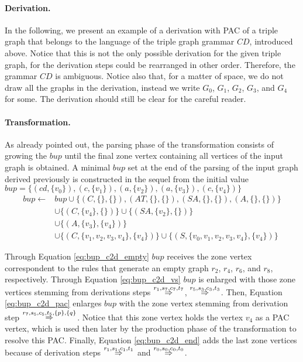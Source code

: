 \paragraph*{Derivation. } In the following, we present an example of a derivation with PAC of a triple graph that belongs to the language of the triple graph grammar $CD$, introduced above. Notice that this is not the only possible derivation for the given triple graph, for the derivation steps could be rearranged in other order. Therefore, the grammar $CD$ is ambiguous. Notice also that, for a matter of space, we do not draw all the graphs in the derivation, instead we write $G_0$, $G_1$, $G_2$, $G_3$, and $G_4$ for some. The derivation should still be clear for the careful reader.



\paragraph*{Transformation. } As already pointed out, the parsing phase of the transformation consists of growing the $bup$ until the final zone vertex containing all vertices of the input graph is obtained. A minimal $bup$ set at the end of the parsing of the input graph derived previously is constructed in the sequel from the initial value $bup = \{ (cd,\{v_0\}), (c,\{v_1\}), (a,\{v_2\}), (a,\{v_3\}), (c,\{v_4\}) \}$
\begin{align}
	\label{eq:bup_c2d_empty}
	bup \gets & bup \cup \{ (C, \{\}, \{\}),(AT, \{\}, \{\}),(SA, \{\}, \{\}),(A, \{\}, \{\}) \} \\
	\label{eq:bup_c2d_vs}
	& \cup \{ (C,\{v_4\}, \{\}) \} \cup \{ (SA,\{v_2\}, \{\}) \} \\
	\label{eq:bup_c2d_pac}
	& \cup \{ (A,\{v_3\}, \{v_4\}) \} \\
	\label{eq:bup_c2d_end}
	& \cup \{ (C,\{v_1,v_2,v_3,v_4\}, \{v_4\}) \} \cup \{ (S,\{v_0,v_1,v_2,v_3,v_4\}, \{v_4\}) \}
\end{align}

Through Equation \ref{eq:bup_c2d_empty} $bup$ receives the zone vertex correspondent to the rules that generate an empty graph $r_2$, $r_4$, $r_6$, and $r_8$, respectively. Through Equation \ref{eq:bup_c2d_vs} $bup$ is enlarged with those zone vertices stemming from derivations steps $\tderivpac{r_1}{s_7,c_7,t_7}{}{}$, $\tderivpac{r_5}{s_3,c_3,t_3}{}{}$. Then, Equation \ref{eq:bup_c2d_pac} enlarges $bup$ with the zone vertex stemming from derivation step $\tderivpac{r_7}{s_5,c_5,t_5}{\{p\},\{q\}}{}$. Notice that this zone vertex holds the vertex $v_4$ as a PAC vertex, which is used then later by the production phase of the transformation to resolve this PAC. Finally, Equation \ref{eq:bup_c2d_end} adds the last zone vertices because of derivation steps $\tderivpac{r_1}{s_1,c_1,t_1}{}{}$ and $\tderivpac{r_0}{s_0,c_0,t_0}{}{}$.

